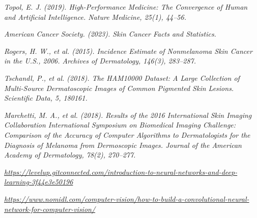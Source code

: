 \documentclass[a4paper,12pt]{report}
\begin{document}
\begin{spacing}{1.5}
\begin{thebibliography}{99}
 \emph{Topol, E. J. (2019). High-Performance Medicine: The Convergence of Human and Artificial Intelligence. Nature Medicine, 25(1), 44–56.}

 \emph{American Cancer Society. (2023). Skin Cancer Facts and Statistics.}

 \emph{Rogers, H. W., et al. (2015). Incidence Estimate of Nonmelanoma Skin Cancer in the U.S., 2006. Archives of Dermatology, 146(3), 283–287.}

 \emph{Tschandl, P., et al. (2018). The HAM10000 Dataset: A Large Collection of Multi-Source Dermatoscopic Images of Common Pigmented Skin Lesions. Scientific Data, 5, 180161.}

 \emph{Marchetti, M. A., et al. (2018). Results of the 2016 International Skin Imaging Collaboration International Symposium on Biomedical Imaging Challenge: Comparison of the Accuracy of Computer Algorithms to Dermatologists for the Diagnosis of Melanoma from Dermoscopic Images. Journal of the American Academy of Dermatology, 78(2), 270–277.}




 \emph{\url{https://levelup.gitconnected.com/introduction-to-neural-networks-and-deep-learning-3f44e3e50196}}

    \emph{\url{https://www.nomidl.com/computer-vision/how-to-build-a-convolutional-neural-network-for-computer-vision/}}


\end{thebibliography}

\end{spacing}
\end{document}
